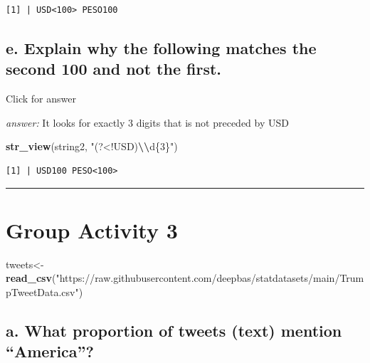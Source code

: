 \documentclass[
]{book}
\newenvironment{Shaded}{\begin{snugshade}}{\end{snugshade}}
\newcommand{\FunctionTok}[1]{\textcolor[rgb]{0.13,0.29,0.53}{\textbf{#1}}}
\newcommand{\NormalTok}[1]{#1}
\newcommand{\OtherTok}[1]{\textcolor[rgb]{0.56,0.35,0.01}{#1}}
\newcommand{\SpecialCharTok}[1]{\textcolor[rgb]{0.81,0.36,0.00}{\textbf{#1}}}
\newcommand{\StringTok}[1]{\textcolor[rgb]{0.31,0.60,0.02}{#1}}
\begin{document}
\begin{verbatim}
[1] | USD<100> PESO100
\end{verbatim}

\hypertarget{e.-explain-why-the-following-matches-the-second-100-and-not-the-first.}{%
\subsection{e. Explain why the following matches the second 100 and not the first.}\label{e.-explain-why-the-following-matches-the-second-100-and-not-the-first.}}

Click for answer

\emph{answer:} It looks for exactly 3 digits that is not preceded by USD

\begin{Shaded}
\begin{Highlighting}[]
\FunctionTok{str\_view}\NormalTok{(string2, }\StringTok{"(?\textless{}!USD)}\SpecialCharTok{\textbackslash{}\textbackslash{}}\StringTok{d\{3\}"}\NormalTok{)}
\end{Highlighting}
\end{Shaded}

\begin{verbatim}
[1] | USD100 PESO<100>
\end{verbatim}

\begin{center}\rule{0.5\linewidth}{0.5pt}\end{center}

\hypertarget{group-activity-3}{%
\section{Group Activity 3}\label{group-activity-3}}

\begin{Shaded}
\begin{Highlighting}[]
\NormalTok{tweets}\OtherTok{\textless{}{-}} \FunctionTok{read\_csv}\NormalTok{(}\StringTok{"https://raw.githubusercontent.com/deepbas/statdatasets/main/TrumpTweetData.csv"}\NormalTok{)}
\end{Highlighting}
\end{Shaded}

\hypertarget{a.-what-proportion-of-tweets-text-mention-america}{%
\subsection{a. What proportion of tweets (text) mention ``America''?}\label{a.-what-proportion-of-tweets-text-mention-america}}
\end{document}
